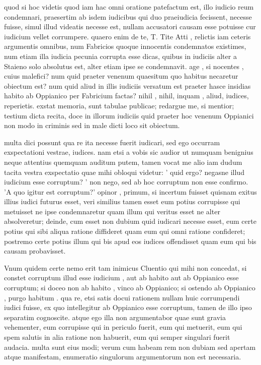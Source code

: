  quod si hoc videtis quod iam hac omni oratione patefactum est, illo iudicio reum condemnari, praesertim ab isdem iudicibus qui duo praeiudicia fecissent, necesse fuisse, simul illud videatis necesse est, nullam accusatori causam esse potuisse cur iudicium vellet corrumpere. quaero enim de te, T. Tite Atti , relictis iam ceteris argumentis omnibus, num Fabricios quoque innocentis condemnatos existimes, num etiam illa iudicia pecunia corrupta esse dicas, quibus in iudiciis alter a Staieno solo absolutus est, alter etiam ipse se condemnavit. age , si nocentes , cuius malefici? num quid praeter venenum quaesitum quo habitus necaretur obiectum est? num quid aliud in illis iudiciis versatum est praeter hasce insidias habito ab Oppianico per Fabricium factas? nihil , nihil, inquam , aliud, iudices, reperietis. exstat memoria, sunt tabulae publicae; redargue me, si mentior; testium dicta recita, doce in illorum iudiciis quid praeter hoc venenum Oppianici non modo in criminis sed in male dicti loco sit obiectum.

 multa dici possunt qua re ita necesse fuerit iudicari, sed ego occurram exspectationi vestrae, iudices. nam etsi a vobis sic audior ut numquam benignius neque attentius quemquam auditum putem, tamen vocat me alio iam dudum tacita vestra exspectatio quae mihi obloqui videtur: ' quid ergo? negasne illud iudicium esse corruptum? ' non nego, sed ab hoc corruptum non esse confirmo. 'A quo igitur est corruptum?' opinor , primum, si incertum fuisset quisnam exitus illius iudici futurus esset, veri similius tamen esset eum potius corrupisse qui metuisset ne ipse condemnaretur quam illum qui veritus esset ne alter absolveretur; deinde, cum esset non dubium quid iudicari necesse esset, eum certe potius qui sibi aliqua ratione diffideret quam eum qui omni ratione confideret; postremo certe potius illum qui bis apud eos iudices offendisset quam eum qui bis causam probavisset.

 Vnum quidem certe nemo erit tam inimicus Cluentio qui mihi non concedat, si constet corruptum illud esse iudicium , aut ab habito aut ab Oppianico esse corruptum; si doceo non ab habito , vinco ab Oppianico; si ostendo ab Oppianico , purgo habitum . qua re, etsi satis docui rationem nullam huic corrumpendi iudici fuisse, ex quo intellegitur ab Oppianico esse corruptum, tamen de illo ipso separatim cognoscite. atque ego illa non argumentabor quae sunt gravia vehementer, eum corrupisse qui in periculo fuerit, eum qui metuerit, eum qui spem salutis in alia ratione non habuerit, eum qui semper singulari fuerit audacia. multa sunt eius modi; verum cum habeam rem non dubiam sed apertam atque manifestam, enumeratio singulorum argumentorum non est necessaria.

